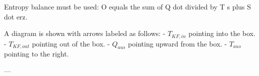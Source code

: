 Entropy balance must be used:  
O equals the sum of Q dot divided by T s plus S dot erz.  

A diagram is shown with arrows labeled as follows:  
- \( T_{KF,in} \) pointing into the box.  
- \( T_{KF,out} \) pointing out of the box.  
- \( Q_{aus} \) pointing upward from the box.  
- \( T_{aus} \) pointing to the right.  

---